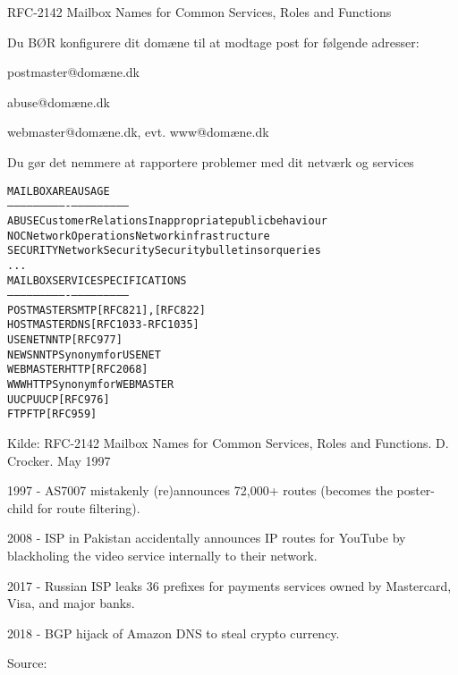 \documentclass[Screen16to9,17pt]{foils}
\begin{document}

\begin{list1}
\item RFC-2142 Mailbox Names for Common Services, Roles and Functions
\item Du BØR konfigurere dit domæne til at modtage post for følgende adresser:
\begin{list2}
\item postmaster@domæne.dk
\item abuse@domæne.dk
\item webmaster@domæne.dk, evt. www@domæne.dk
\end{list2}
\item Du gør det nemmere at rapportere problemer med dit netværk og services
\end{list1}


\begin{alltt}\small
MAILBOX       AREA                USAGE
-----------   ----------------    ---------------------------
ABUSE         Customer Relations  Inappropriate public behaviour
NOC           Network Operations  Network infrastructure
SECURITY      Network Security    Security bulletins or queries
...
MAILBOX       SERVICE             SPECIFICATIONS
-----------   ----------------    ---------------------------
POSTMASTER    SMTP                [RFC821], [RFC822]
HOSTMASTER    DNS                 [RFC1033-RFC1035]
USENET        NNTP                [RFC977]
NEWS          NNTP                Synonym for USENET
WEBMASTER     HTTP                [RFC 2068]
WWW           HTTP                Synonym for WEBMASTER
UUCP          UUCP                [RFC976]
FTP           FTP                 [RFC959]
\end{alltt}

Kilde:
RFC-2142 Mailbox Names for Common Services, Roles and Functions. D.
Crocker. May 1997




{\small{}}



\begin{list2}
\item 1997 - AS7007 mistakenly (re)announces 72,000+ routes (becomes the poster-child for route filtering).
\item 2008 - ISP in Pakistan accidentally announces IP routes for YouTube by blackholing the video service internally to their network.
\item 2017 - Russian ISP leaks 36 prefixes for payments services owned by Mastercard, Visa, and major banks.
\item 2018 - BGP hijack of Amazon DNS to steal crypto currency.
\end{list2}
Source: 
\end{document}
